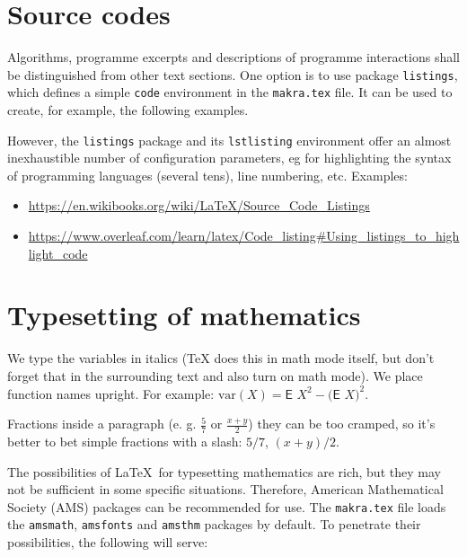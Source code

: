 \section{Source codes}

Algorithms, programme excerpts and descriptions of programme interactions shall 
be distinguished from other text sections. One option is to use package 
\texttt{listings}, which defines a simple \texttt{code} environment in the 
\texttt{makra.tex} file. It can be used to create, for example, the following 
examples.


However, the \texttt{listings} package and its \texttt{lstlisting} environment 
offer an almost inexhaustible number of configuration parameters, eg for 
highlighting the syntax of programming languages (several tens), line numbering, 
etc. Examples:

\begin{itemize}
\item \url{https://en.wikibooks.org/wiki/LaTeX/Source_Code_Listings}
\item \url{https://www.overleaf.com/learn/latex/Code_listing#Using_listings_to_highlight_code}
\end{itemize}


\section{Typesetting of mathematics}

We type the variables in italics (\TeX{} does this in math mode itself, but 
don't forget that in the surrounding text and also turn on math mode). We place 
function names upright. For example:
$\textrm{var} (X) = \textsf{E~} X^2 - \bigl(\textsf{E~} X \bigr)^2$.

Fractions inside a paragraph (e. g. $$ or $$) they can 
be too cramped, so it's better to bet simple fractions with a slash: $5/7$, 
$(x+y)/2$.

The possibilities of \LaTeX\ for typesetting mathematics are rich, but they may 
not be sufficient in some specific situations. Therefore, American Mathematical 
Society (AMS) packages can be recommended for use. The \texttt{makra.tex} file 
loads the \texttt{amsmath}, \texttt{amsfonts} and \texttt{amsthm} packages 
by default. To penetrate their possibilities, the following will serve:

